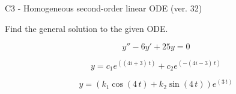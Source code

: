 \begin{exercise}
  \begin{exerciseTitle}C3 - Homogeneous second-order linear ODE (ver. 32)\end{exerciseTitle}
  \begin{exerciseStatement}
    
Find the general solution to the given ODE.

    
\[y''-6y'+25y = 0\]

  \end{exerciseStatement}
  \begin{exerciseAnswer}
    
\[y= c_{1} e^{\left(\left(4 i + 3\right) \, t\right)} + c_{2} e^{\left(-\left(4 i - 3\right) \, t\right)}\]

    
\[y= {\left(k_{1} \cos\left(4 \, t\right) + k_{2} \sin\left(4 \, t\right)\right)} e^{\left(3 \, t\right)}\]

  \end{exerciseAnswer}
\end{exercise}